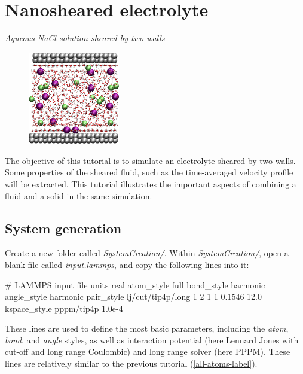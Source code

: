 \chapter{Nanosheared electrolyte}
\label{sheared-confined-label}

\vspace{-1cm} \noindent \textcolor{graytitle}{\textit{{\Large Aqueous NaCl solution sheared by two walls}}\vspace{0.5cm} }

\noindent \hspace{-0.45cm}\begin{figure}
\includegraphics[width=4cm]{tutorials/level2/nanosheared-electrolyte/nanoconfined-electrolyte-light.png}
\end{figure}

\noindent The objective of this tutorial is to
simulate an electrolyte sheared by two walls. Some properties
of the sheared fluid, such as the time-averaged velocity profile
will be extracted. 
This tutorial illustrates the important aspects of
combining a fluid and a solid in the same simulation.

\section{System generation}

\noindent Create a new folder called \textit{SystemCreation/}. Within \textit{SystemCreation/},
open a blank file called \textit{input.lammps}, and copy 
the following lines into it:

\begin{lcverbatim}
# LAMMPS input file
units real
atom_style full
bond_style harmonic
angle_style harmonic
pair_style lj/cut/tip4p/long 1 2 1 1 0.1546 12.0
kspace_style pppm/tip4p 1.0e-4
\end{lcverbatim}

\noindent These lines are used to define the most basic parameters,
including the \textit{atom}, \textit{bond}, and \textit{angle} styles, as well as 
interaction potential (here Lennard Jones with cut-off and long 
range Coulombic) and long range solver (here PPPM). 
These lines are relatively similar to the 
previous tutorial (\ref{all-atoms-label}).

